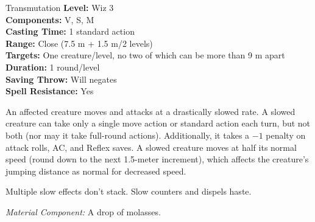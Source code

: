 {Transmutation}
{
	\textbf{Level:}
	Wiz 3\\
	\textbf{Components:}
	V, S, M\\
	\textbf{Casting Time:}
	1 standard action\\
	\textbf{Range:}
	Close (7.5 m + 1.5 m/2 levels)\\
	\textbf{Targets:}
	One creature/level, no two of which can be more than 9 m apart\\
	\textbf{Duration:}
	1 round/level\\
	\textbf{Saving Throw:}
	Will negates\\
	\textbf{Spell Resistance:}
	Yes\\
}
{
	An affected creature moves and attacks at a drastically slowed rate. A slowed creature can take only a single move action or standard action each turn, but not both (nor may it take full-round actions). Additionally, it takes a $-1$ penalty on attack rolls, AC, and Reflex saves. A slowed creature moves at half its normal speed (round down to the next 1.5-meter increment), which affects the creature's jumping distance as normal for decreased speed.

	Multiple slow effects don't stack. Slow counters and dispels haste.

	\textit{Material Component:}
	A drop of molasses.

}
